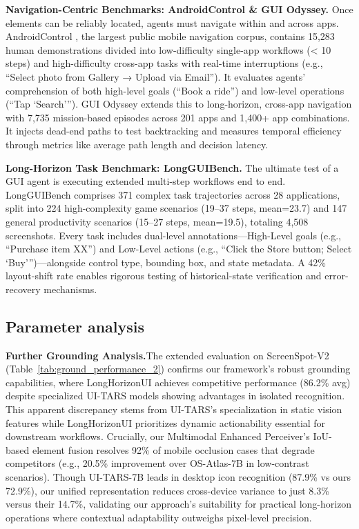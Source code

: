 \documentclass{article} %
\newcommand{\mypara}[1]{\vspace{0.4em}\noindent\textbf{#1}\hspace{0.2cm}}
\begin{document}
\mypara{Navigation-Centric Benchmarks: AndroidControl \& GUI Odyssey.}
Once elements can be reliably located, agents must navigate within and across apps. AndroidControl \citep{NEURIPS2024_androidcontrol}, the largest public mobile navigation corpus, contains 15,283 human demonstrations divided into low-difficulty single-app workflows (< 10 steps) and high-difficulty cross-app tasks with real-time interruptions (e.g., “Select photo from Gallery → Upload via Email”). It evaluates agents’ comprehension of both high-level goals (“Book a ride”) and low-level operations (“Tap ‘Search’”). GUI Odyssey \citep{2024_gui_odyssey} extends this to long-horizon, cross-app navigation with 7,735 mission-based episodes across 201 apps and 1,400+ app combinations. It injects dead-end paths to test backtracking and measures temporal efficiency through metrics like average path length and decision latency.



\mypara{Long-Horizon Task Benchmark: LongGUIBench.}
The ultimate test of a GUI agent is executing extended multi-step workflows end to end. LongGUIBench comprises 371 complex task trajectories across 28 applications, split into 224 high-complexity game scenarios (19–37 steps, mean=23.7) and 147 general productivity scenarios (15–27 steps, mean=19.5), totaling 4,508 screenshots. Every task includes dual-level annotations—High-Level goals (e.g., “Purchase item XX”) and Low-Level actions (e.g., “Click the Store button; Select ‘Buy’”)—alongside control type, bounding box, and state metadata. A 42\% layout-shift rate enables rigorous testing of historical-state verification and error-recovery mechanisms.




\subsection{Parameter analysis}
\label{sec:Parameter_analysis}

\mypara{Further Grounding Analysis.}The extended evaluation on ScreenSpot-V2 (Table~\ref{tab:ground_performance_2}) confirms our framework's robust grounding capabilities, where LongHorizonUI achieves competitive performance (86.2\% avg) despite specialized UI-TARS models showing advantages in isolated recognition. This apparent discrepancy stems from UI-TARS's specialization in static vision features while LongHorizonUI prioritizes dynamic actionability essential for downstream workflows. Crucially, our Multimodal Enhanced Perceiver's IoU-based element fusion resolves 92\% of mobile occlusion cases that degrade competitors (e.g., 20.5\% improvement over OS-Atlas-7B in low-contrast scenarios). Though UI-TARS-7B leads in desktop icon recognition (87.9\% vs ours 72.9\%), our unified representation reduces cross-device variance to just 8.3\% versus their 14.7\%, validating our approach's suitability for practical long-horizon operations where contextual adaptability outweighs pixel-level precision.
\end{document}
